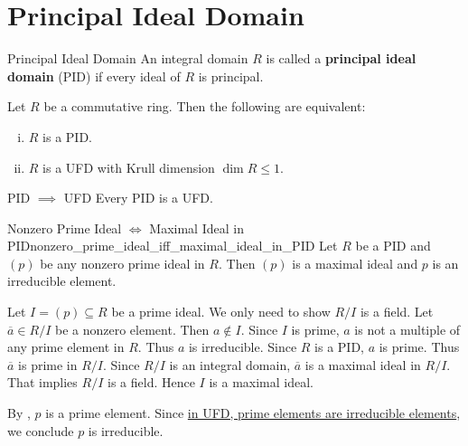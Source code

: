 \section{Principal Ideal Domain}
\begin{definition}{Principal Ideal Domain}{}
    An integral domain $R$ is called a \textbf{principal ideal domain} (PID) if every ideal of $R$ is principal.
\end{definition}

\begin{proposition}{}{}
    Let $R$ be a commutative ring. Then the following are equivalent:
    \begin{enumerate}[(i)]
        \item $R$ is a PID.
        \item $R$ is a UFD with Krull dimension $\dim R \le 1$.
    \end{enumerate}
\end{proposition}
\begin{corollary}{PID $\implies$ UFD}{}
    Every PID is a UFD.
\end{corollary}


\begin{proposition}{Nonzero Prime Ideal $\iff$ Maximal Ideal in PID}{nonzero_prime_ideal_iff_maximal_ideal_in_PID}
    Let $R$ be a PID and $(p)$ be any nonzero prime ideal in $R$. Then $(p)$ is a maximal ideal and $p$ is an irreducible element.
\end{proposition}

\begin{prf}
    Let $I=(p)\subseteq R$ be a prime ideal. We only need to show $R/I$ is a field. Let $\overline{a}\in R/I$ be a nonzero element. Then $a\notin I$. Since $I$ is prime, $a$ is not a multiple of any prime element in $R$. Thus $a$ is irreducible. Since $R$ is a PID, $a$ is prime. Thus $\overline{a}$ is prime in $R/I$. Since $R/I$ is an integral domain, $\overline{a}$ is a maximal ideal in $R/I$. That implies $R/I$ is a field. Hence $I$ is a maximal ideal.

    By , $p$ is a prime element. Since \hyperref[th:irreducible_element_iff_prime_element_in_UFD]{ in UFD, prime elements are irreducible elements}, we conclude $p$ is irreducible.
\end{prf}







